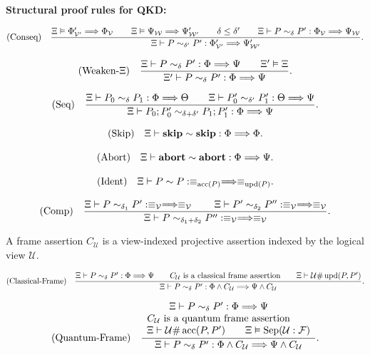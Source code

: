 \documentclass[acmsmall,screen,review,anonymous,nonacm]{acmart}
\theoremstyle{defn_style}
\begin{document}
\textbf{Structural proof rules for QKD:}

\[
\text{\rm (Conseq)}
\quad
\frac{
\Xi
\vDash
\Phi'_{\mathcal V'}
\Longrightarrow
\Phi_{\mathcal V}
\qquad
\Xi
\vDash
\Psi_{\mathcal W}
\Longrightarrow
\Psi'_{\mathcal W'}
\qquad
\delta\leq\delta'
\qquad
\Xi
\vdash
P\sim_{\delta}P':
\Phi_{\mathcal V}
\Longrightarrow
\Psi_{\mathcal W}
}{
\Xi
\vdash
P\sim_{\delta'}P':
\Phi'_{\mathcal V'}
\Longrightarrow
\Psi'_{\mathcal W'}
}.
\]

\[
\text{\rm (Weaken-\(\Xi\))}
\quad
\frac{
\Xi
\vdash
P\sim_{\delta}P':
\Phi\Longrightarrow\Psi
\qquad
\Xi'\vDash\Xi
}{
\Xi'
\vdash
P\sim_{\delta}P':
\Phi\Longrightarrow\Psi
}.
\]

\[
\text{\rm (Seq)}
\quad
\frac{
\Xi
\vdash
P_0\sim_{\delta}P_1:
\Phi\Longrightarrow\Theta
\qquad
\Xi
\vdash
P'_0\sim_{\delta'}P'_1:
\Theta\Longrightarrow\Psi
}{
\Xi
\vdash
P_0;P'_0
\sim_{\delta+\delta'}
P_1;P'_1
:
\Phi\Longrightarrow\Psi
}.
\]

\[
\text{\rm (Skip)}
\quad
\Xi
\vdash
\mathbf{skip}\sim\mathbf{skip}:
\Phi\Longrightarrow\Phi .
\]

\[
\text{\rm (Abort)}
\quad
\Xi
\vdash
\mathbf{abort}\sim\mathbf{abort}:
\Phi\Longrightarrow\Psi .
\]

\[
\text{\rm (Ident)}
\quad
{
\Xi
\vdash
P\sim P:
\equiv_{\operatorname{acc} (P)}
\Longrightarrow
\equiv_{\operatorname{upd} (P)}
}.
\]

\[
\text{\rm (Comp)}
\quad
\frac{
\Xi
\vdash
P\sim_{\delta_1}P':
\equiv_{\mathcal V}
\Longrightarrow
\equiv_{\mathcal V}
\qquad
\Xi
\vdash
P'\sim_{\delta_2}P'':
\equiv_{\mathcal V}
\Longrightarrow
\equiv_{\mathcal V}
}{
\Xi
\vdash
P\sim_{\delta_1+\delta_2}P'':
\equiv_{\mathcal V}
\Longrightarrow
\equiv_{\mathcal V}
}.
\]


A frame assertion \(C_{\mathcal U}\) is a view-indexed projective assertion
indexed by the logical view \(\mathcal U\). 

\[
\text{\rm (Classical-Frame)}
\quad
\frac{
\Xi
\vdash
P\sim_{\delta}P':
\Phi\Longrightarrow\Psi
\qquad
C_{\mathcal U}\text{ is a classical frame assertion}
\qquad
\Xi\vdash
\mathcal U
\#
\operatorname{upd}(P,P')
}{
\Xi
\vdash
P\sim_{\delta}P':
\Phi\land C_{\mathcal U}
\Longrightarrow
\Psi\land C_{\mathcal U}
}.
\]

\[
\text{\rm (Quantum-Frame)}
\quad
\frac{\begin{array}{c}
\Xi
\vdash
P\sim_{\delta}P':
\Phi\Longrightarrow\Psi
\qquad\\
C_{\mathcal U}\text{ is a quantum frame assertion}
\qquad\\
\Xi\vdash
\mathcal U\#\operatorname{acc}(P,P')
\qquad
\Xi\vDash
\operatorname{Sep}(\mathcal U:\mathcal F)
\end{array}}{
\Xi
\vdash
P\sim_{\delta}P':
\Phi\land C_{\mathcal U}
\Longrightarrow
\Psi\land C_{\mathcal U}
}.
\]
\end{document}
